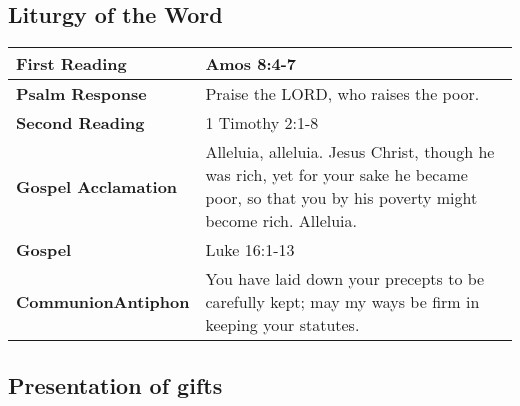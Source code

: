 \documentclass[12pt]{article}
\begin{document}
\begin{center}
\subsection*{Liturgy of the Word}
\begin{tabular}{ |p{}|p{}| }
\hline\textbf{First Reading} & Amos 8:4-7\\
\hline
\textbf{Psalm Response} & Praise the LORD, who raises the poor.\\
\hline
\textbf{Second Reading} & 1 Timothy 2:1-8\\
\hline
\textbf{Gospel Acclamation} & Alleluia, alleluia. Jesus Christ, though he was rich, yet for your sake he became poor, so that you by his poverty might become rich. Alleluia.\\
\hline
\textbf{Gospel} & Luke 16:1-13\\
\hline
\textbf{Communion\newline Antiphon} & You have laid down your precepts to be carefully kept; may my ways be firm in keeping your statutes.\\
\hline
\end{tabular}\end{center}\begin{center}
\subsection*{Presentation of gifts}
\end{center}
\end{document}

